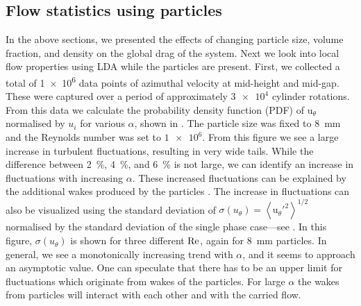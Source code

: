 \subsection{Flow statistics using particles} 
In the above sections, we presented the effects of changing particle size,
volume fraction, and density on the global drag of the system. Next we look
into local flow
properties using LDA while the particles are present.  First, we collected a
total of \num{1e6} data points of azimuthal velocity at mid-height and
mid-gap.  These were captured over a period of approximately $\num{3e4}$
cylinder rotations. From this data we calculate the probability density
function (PDF) of $\text{u}_\theta$ normalised by $u_i$ for various $\alpha$,
shown in . The particle size was fixed to
\SI{8}{\milli\metre} and the Reynolds number was set to $\num{1e6}$. From this
figure we see a large increase in turbulent fluctuations, resulting in very
wide tails. While the difference between \SI{2}{\percent}, \SI{4}{\percent},
and \SI{6}{\percent} is not large, we can identify an increase in fluctuations
with increasing $\alpha$. These increased fluctuations can be explained by the
additional wakes produced by the particles \citep{Poelma2007,Almeras2017}. The
increase in fluctuations can also be visualized using the standard deviation
of $\sigma(u_\theta) = \left< \text{u}_\theta'^2 \right>^{1/2}$ normalised by
the standard deviation of the single phase case---see 
. In this figure, $\sigma(u_\theta)$ is shown for
three different $\text{Re}$, again for \SI{8}{\milli\metre} particles. In general,
we see a monotonically increasing trend with $\alpha$, and it seems to
approach an asymptotic value. One can speculate that there has to be an upper
limit for fluctuations which originate from wakes of the particles. For large
$\alpha$ the wakes from particles will interact with each other and with the
carried flow.

